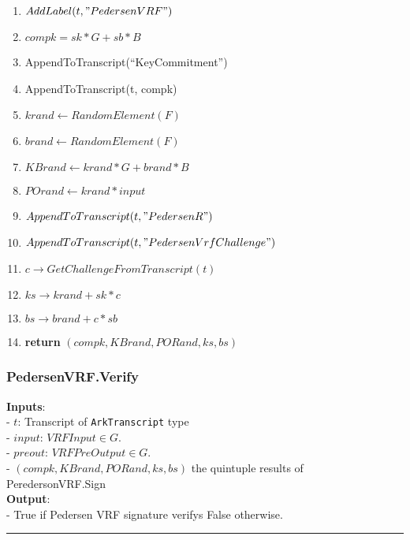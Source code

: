 \documentclass[
]{article}
\providecommand{\tightlist}{%
  \setlength{\itemsep}{0pt}\setlength{\parskip}{0pt}}
\begin{document}
\begin{enumerate}
\def\labelenumi{\arabic{enumi}.}
\tightlist
\item
  \(AddLabel(t, "PedersenVRF")\)
\item
  \(compk = sk*G + sb*B\)
\item
  AppendToTranscript(``KeyCommitment'')
\item
  AppendToTranscript(t, compk)
\item
  \(krand \leftarrow RandomElement(F)\)
\item
  \(brand \leftarrow RandomElement(F)\)
\item
  \(KBrand \leftarrow krand * G + brand * B\)
\item
  \(POrand \leftarrow krand * input\)
\item
  \(AppendToTranscript(t, "Pedersen R")\)
\item
  \(AppendToTranscript(t, "PedersenVrfChallenge")\)
\item
  \(c \rightarrow GetChallengeFromTranscript(t)\)
\item
  \(ks \rightarrow krand + sk * c\)
\item
  \(bs \rightarrow brand + c * sb\)
\item
  \textbf{return} \((compk, KBrand, PORand, ks, bs)\)
\end{enumerate}

\hypertarget{pedersenvrf.verify}{%
\subsubsection{PedersenVRF.Verify}\label{pedersenvrf.verify}}

\textbf{Inputs}:\\
- \(t\): Transcript of \texttt{ArkTranscript} type\\
- \(input\): \(VRFInput \in G\).\\
- \(preout\): \(VRFPreOutput \in G\).\\
- \((compk, KBrand, PORand, ks, bs)\) the quintuple results of
PeredersonVRF.Sign\\
\textbf{Output}:\\
- True if Pedersen VRF signature verifys False otherwise.

\begin{center}\rule{0.5\linewidth}{0.5pt}\end{center}
\end{document}
